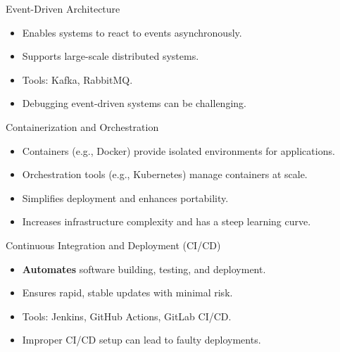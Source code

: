 \documentclass[aspectratio=169, table]{beamer}
\begin{document}
	\begin{frame}{Event-Driven Architecture}
		\begin{itemize}
			\item Enables systems to react to events asynchronously.
			\item Supports large-scale distributed systems.
			\item Tools: Kafka, RabbitMQ.
			\item Debugging event-driven systems can be challenging.
		\end{itemize}
	\end{frame}
	
	\begin{frame}{Containerization and Orchestration}
		\begin{itemize}
			\item Containers (e.g., Docker) provide isolated environments for applications.
			\item Orchestration tools (e.g., Kubernetes) manage containers at scale.
			\item Simplifies deployment and enhances portability.
			\item Increases infrastructure complexity and has a steep learning curve.
		\end{itemize}
	\end{frame}
	
	\begin{frame}{\LARGE{Continuous Integration and Deployment (CI/CD)}}
		\begin{itemize}
			\item \textbf{Automates} software building, testing, and deployment.
			\item Ensures rapid, stable updates with minimal risk.
			\item Tools: Jenkins, GitHub Actions, GitLab CI/CD.
			\item Improper CI/CD setup can lead to faulty deployments.
		\end{itemize}
	\end{frame}
	
\end{document}
